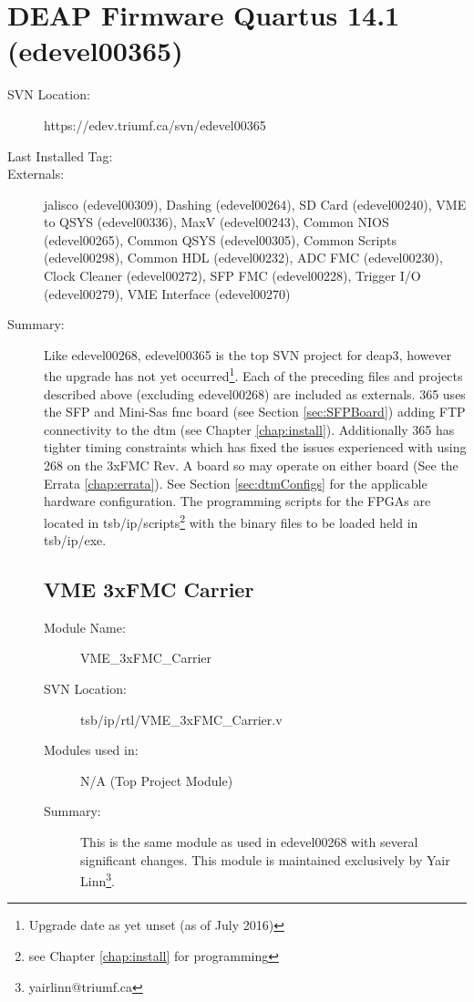 \section{DEAP Firmware Quartus 14.1 (edevel00365)}
\label{sec:365}
\begin{description}
\item[SVN Location:] https://edev.triumf.ca/svn/edevel00365
\item[Last Installed Tag:] \tagThreeSixFive %
\item[Externals:]  \gls{jalisco} (edevel00309), Dashing (edevel00264), SD Card (edevel00240), VME to QSYS (edevel00336), MaxV (edevel00243), Common NIOS (edevel00265), Common QSYS (edevel00305), Common Scripts (edevel00298), Common HDL (edevel00232), ADC FMC (edevel00230), Clock Cleaner (edevel00272), SFP FMC (edevel00228), Trigger I/O (edevel00279), VME Interface (edevel00270)
\item[Summary: ]Like edevel00268, edevel00365 is the top SVN project for \gls{deap3}, however the upgrade has not yet occurred\footnote{Upgrade date as yet unset (as of July 2016)}. Each of the preceding files and projects described above (excluding edevel00268) are included as externals. 365 uses the SFP and Mini-Sas \gls{fmc} board (see Section \ref{sec:SFPBoard}) adding FTP connectivity to the \gls{dtm} (see Chapter \ref{chap:install}). Additionally 365 has tighter timing constraints which has fixed the issues experienced with using 268 on the 3xFMC Rev. A board so may operate on either board (See the Errata \ref{chap:errata}). See Section \ref{sec:dtmConfigs} for the applicable hardware configuration. The programming scripts for the FPGAs are located in tsb/ip/scripts\footnote{see Chapter \ref{chap:install} for programming} with the binary files to be loaded held in tsb/ip/exe.


	\subsection{VME 3xFMC Carrier} 
	\label{sec:VME_3xFMC_Carrier365}
	\begin{description}
	\item[Module Name:] VME\_3xFMC\_Carrier
	\item[SVN Location:]  tsb/ip/rtl/VME\_3xFMC\_Carrier.v
	\item[Modules used in:] N/A (Top Project Module)
	\item[Summary: ] This is the same module as used in edevel00268 with several significant changes. This module is maintained exclusively by Yair Linn\footnote{yairlinn@triumf.ca}.
	\end{description}
	
\end{description}
